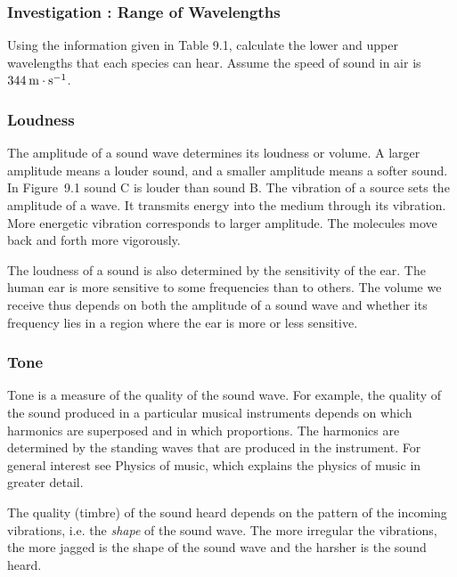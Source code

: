             \subsubsection{  Investigation : Range of Wavelengths }
            \nopagebreak
        \label{m38799*id183776}Using the information given in Table 9.1, calculate the lower and upper wavelengths that each species can hear. Assume the speed of sound in air is $344\phantom{\rule{2pt}{0ex}}\mathrm{m}\ensuremath{\cdot}\mathrm{s}{}^{-1}$. \par 
      \label{m38799*uid4}
            \subsubsection{ Loudness}
            \nopagebreak
        \label{m38799*id183826}The amplitude of a sound wave determines its loudness or volume. A larger amplitude means a louder sound, and a smaller amplitude means a softer sound. In Figure~9.1 sound C is louder than sound B. The vibration of a source sets the amplitude of a wave. It transmits energy into the medium through its vibration. More energetic vibration corresponds to larger amplitude. The molecules move back and forth more vigorously.\par 
        \label{m38799*id183839}The loudness of a sound is also determined by the sensitivity of the ear. The human ear is more sensitive to some frequencies than to others. The volume we receive thus depends on both the amplitude of a sound wave and whether its frequency lies in a region where the ear is more or less sensitive.\par 
      \label{m38799*uid5}
            \subsubsection{ Tone}
            \nopagebreak
        \label{m38799*id183854}Tone is a measure of the quality of the sound wave. For example, the quality of the sound produced in a particular musical instruments depends on which
harmonics are superposed and in which proportions. The harmonics are determined by the standing waves that are produced in the instrument. For general interest see Physics of music, which explains the physics of music in greater detail.\par 
        \label{m38799*id183865}The quality (timbre) of the sound heard depends on the pattern of the incoming vibrations, i.e. the \textsl{shape} of the sound wave. The more irregular the vibrations, the more jagged is the shape of the sound wave and the harsher is the sound heard.\par 
    \label{m38799*cid4}
